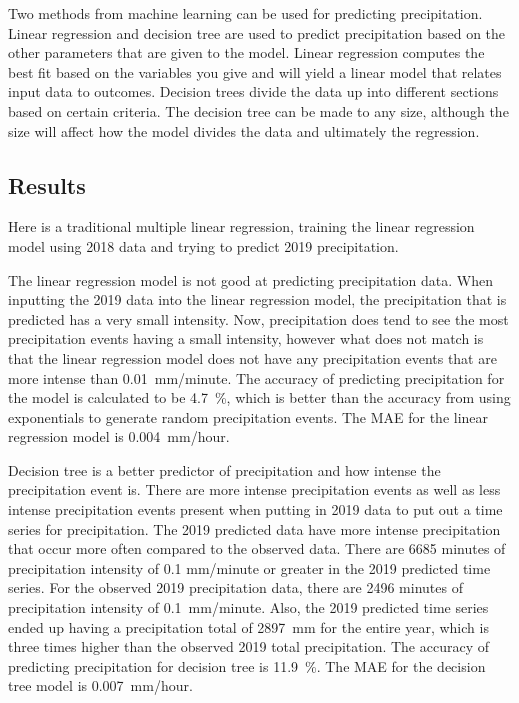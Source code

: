 \documentclass[11pt]{report}
\begin{document}
Two methods from machine learning can be used for predicting
precipitation. Linear regression and decision tree are used to predict
precipitation based on the other parameters that are given to the
model. Linear regression computes the best fit based on the variables you
give and will yield a linear model that relates input data to outcomes.
Decision trees divide the data up into different sections based on certain
criteria. The decision tree can be made to any size, although the size will 
affect how the model divides the data and ultimately the regression. 



\subsection{Results}

Here is a traditional multiple linear regression, training the linear
regression model using 2018 data and trying to predict 2019 precipitation.

The linear regression model is not good at predicting precipitation data. When inputting the 2019 data into the linear regression model, the precipitation that is predicted has a very small intensity. Now, precipitation does tend to see the most precipitation events having a small intensity, however what does not match is that the linear regression model does not have any precipitation events that are more intense than 0.01~mm/minute. The accuracy of predicting precipitation for the model is calculated to be 4.7~\%, which is better than the accuracy from using exponentials to generate random precipitation events. The MAE for the linear regression model is 0.004~mm/hour.


Decision tree is a better predictor of precipitation and how intense the precipitation event is. There are more intense precipitation events as well as less intense precipitation events present when putting in 2019 data to put out a time series for precipitation. The 2019 predicted data have more intense precipitation that occur more often compared to the observed data. There are 6685 minutes of precipitation intensity of 0.1 mm/minute or greater in the 2019 predicted time series. For the observed 2019 precipitation data, there are 2496 minutes of precipitation intensity of 0.1~mm/minute. Also, the 2019 predicted time series ended up having a precipitation total of 2897~mm for the entire year, which is three times higher than the observed 2019 total precipitation. The accuracy of predicting precipitation for decision tree is 11.9~\%. The MAE for the decision tree model is 0.007~mm/hour.
\end{document}
